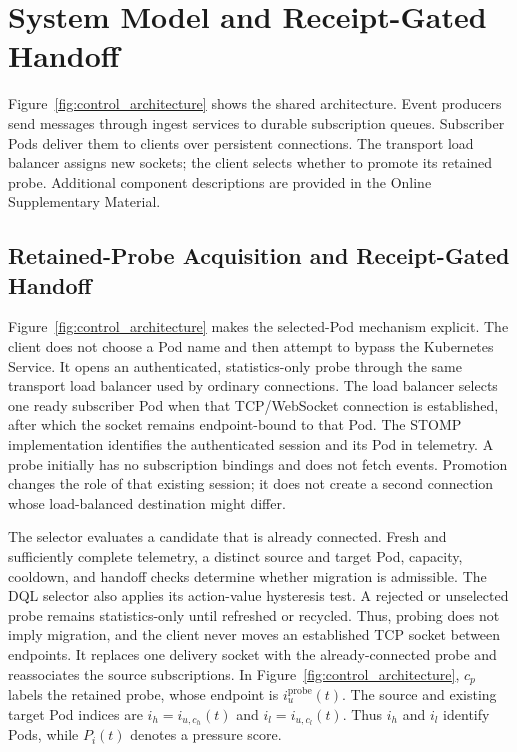 \section{System Model and Receipt-Gated Handoff}
Figure~\ref{fig:control_architecture} shows the shared architecture. Event
producers send messages through ingest services to durable subscription queues.
Subscriber Pods deliver them to clients over persistent connections. The
transport load balancer assigns new sockets; the client selects whether to
promote its retained probe. Additional component descriptions are provided in
the Online Supplementary Material.
\subsection{Retained-Probe Acquisition and Receipt-Gated Handoff}
\label{sec:probe_handoff}

Figure~\ref{fig:control_architecture} makes the selected-Pod mechanism
explicit. The client does not choose a Pod name and then attempt to bypass the
Kubernetes Service. It opens an authenticated, statistics-only probe through
the same transport load balancer used by ordinary connections. The load
balancer selects one ready subscriber Pod when that TCP/WebSocket connection is
established, after which the socket remains endpoint-bound to that Pod. The
STOMP implementation identifies the authenticated session and its Pod in
telemetry. A probe initially has no subscription bindings and does not fetch
events. Promotion changes the role of that existing session; it does not
create a second connection whose load-balanced destination might differ.

The selector evaluates a candidate that is already connected. Fresh and
sufficiently complete telemetry, a distinct source and target Pod, capacity,
cooldown, and handoff checks determine whether migration is admissible. The
DQL selector also applies its action-value hysteresis test. A rejected or
unselected probe remains statistics-only until refreshed or recycled. Thus,
probing does not imply migration, and the client never moves an established
TCP socket between endpoints. It replaces one delivery socket with the
already-connected probe and reassociates the source subscriptions.
In Figure~\ref{fig:control_architecture}, $c_p$ labels the retained probe,
whose endpoint is $i_u^{\mathrm{probe}}(t)$. The source and existing target Pod indices
are $i_h=i_{u,c_h}(t)$ and $i_l=i_{u,c_l}(t)$. Thus $i_h$ and $i_l$ identify
Pods, while $P_i(t)$ denotes a pressure score.

